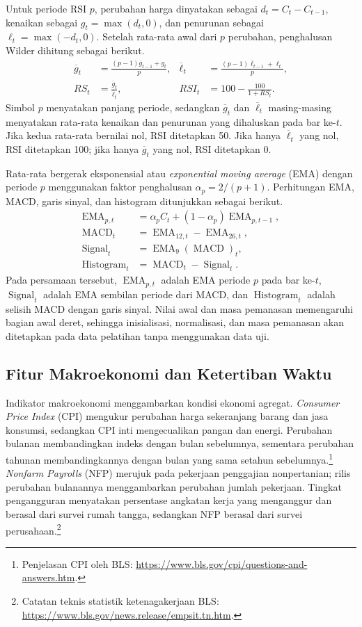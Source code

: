 Untuk periode RSI $p$, perubahan harga dinyatakan sebagai $d_t=C_t-C_{t-1}$, kenaikan sebagai $g_t=\max(d_t,0)$, dan penurunan sebagai $\ell_t=\max(-d_t,0)$. Setelah rata-rata awal dari $p$ perubahan, penghalusan Wilder dihitung sebagai berikut.
\begin{align}
\overline g_t&=\frac{(p-1)\overline g_{t-1}+g_t}{p}, &
\overline \ell_t&=\frac{(p-1)\overline \ell_{t-1}+\ell_t}{p},\\
RS_t&=\frac{\overline g_t}{\overline \ell_t}, &
RSI_t&=100-\frac{100}{1+RS_t}.
\end{align}
Simbol $p$ menyatakan panjang periode, sedangkan $\overline g_t$ dan $\overline \ell_t$ masing-masing menyatakan rata-rata kenaikan dan penurunan yang dihaluskan pada bar ke-$t$. Jika kedua rata-rata bernilai nol, RSI ditetapkan 50. Jika hanya $\overline \ell_t$ yang nol, RSI ditetapkan 100; jika hanya $\overline g_t$ yang nol, RSI ditetapkan 0.

Rata-rata bergerak eksponensial atau \emph{exponential moving average} (EMA) dengan periode $p$ menggunakan faktor penghalusan $\alpha_p=2/(p+1)$. Perhitungan EMA, MACD, garis sinyal, dan histogram ditunjukkan sebagai berikut.
\begin{align}
\operatorname{EMA}_{p,t}&=\alpha_p C_t+(1-\alpha_p)\operatorname{EMA}_{p,t-1},\\
\operatorname{MACD}_t&=\operatorname{EMA}_{12,t}-\operatorname{EMA}_{26,t},\\
\operatorname{Signal}_t&=\operatorname{EMA}_{9}(\operatorname{MACD})_t,\\
\operatorname{Histogram}_t&=\operatorname{MACD}_t-\operatorname{Signal}_t.
\end{align}
Pada persamaan tersebut, $\operatorname{EMA}_{p,t}$ adalah EMA periode $p$ pada bar ke-$t$, $\operatorname{Signal}_t$ adalah EMA sembilan periode dari MACD, dan $\operatorname{Histogram}_t$ adalah selisih MACD dengan garis sinyal. Nilai awal dan masa pemanasan memengaruhi bagian awal deret, sehingga inisialisasi, normalisasi, dan masa pemanasan akan ditetapkan pada data pelatihan tanpa menggunakan data uji.

\subsection{Fitur Makroekonomi dan Ketertiban Waktu}

Indikator makroekonomi menggambarkan kondisi ekonomi agregat. \emph{Consumer Price Index} (CPI) mengukur perubahan harga sekeranjang barang dan jasa konsumsi, sedangkan CPI inti mengecualikan pangan dan energi. Perubahan bulanan membandingkan indeks dengan bulan sebelumnya, sementara perubahan tahunan membandingkannya dengan bulan yang sama setahun sebelumnya.\footnote{Penjelasan CPI oleh BLS: \url{https://www.bls.gov/cpi/questions-and-answers.htm}.} \emph{Nonfarm Payrolls} (NFP) merujuk pada pekerjaan penggajian nonpertanian; rilis perubahan bulanannya menggambarkan perubahan jumlah pekerjaan. Tingkat pengangguran menyatakan persentase angkatan kerja yang menganggur dan berasal dari survei rumah tangga, sedangkan NFP berasal dari survei perusahaan.\footnote{Catatan teknis statistik ketenagakerjaan BLS: \url{https://www.bls.gov/news.release/empsit.tn.htm}.}

